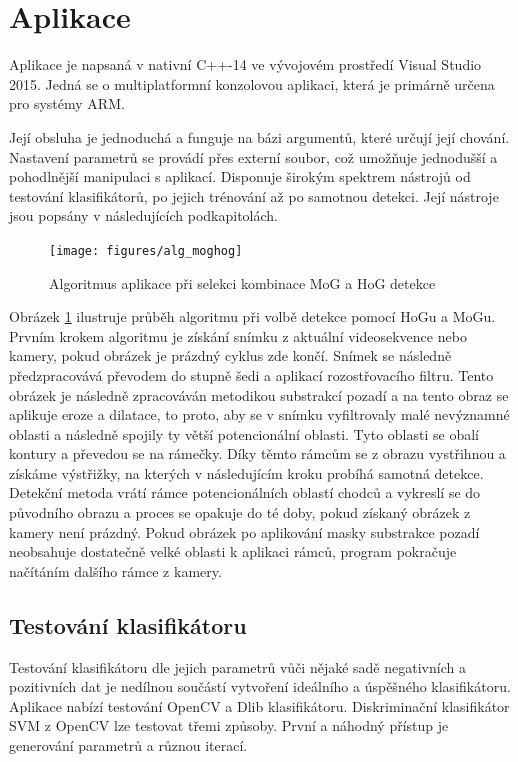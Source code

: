 \section{Aplikace}
Aplikace je napsaná v nativní C++-14 ve vývojovém prostředí Visual Studio 2015. Jedná se o multiplatformní konzolovou aplikaci, která je primárně určena pro systémy ARM. 

Její obsluha je jednoduchá a funguje na bázi argumentů, které určují její chování. Nastavení parametrů se provádí přes externí soubor, což umožňuje jednodušší a pohodlnější manipulaci s aplikací. Disponuje širokým spektrem nástrojů od testování klasifikátorů, po jejich trénování až po samotnou detekci. Její nástroje jsou popsány v následujících podkapitolách.


 \begin{figure}[H]
\centering
\texttt{[image: figures/alg\_moghog]}
\caption{Algoritmus aplikace při selekci kombinace MoG a HoG detekce}
\label{mog_algorithm}
\end{figure}

Obrázek \ref{mog_algorithm} ilustruje průběh algoritmu při volbě detekce pomocí HoGu a MoGu. Prvním krokem algoritmu je získání snímku z aktuální videosekvence nebo kamery, pokud obrázek je prázdný cyklus zde končí. Snímek se následně předzpracovává převodem do stupně šedi a aplikací rozostřovacího filtru. Tento obrázek je následně zpracováván metodikou substrakcí pozadí a na tento obraz se aplikuje eroze a dilatace, to proto, aby se v snímku vyfiltrovaly malé nevýznamné oblasti a následně spojily ty větší potencionální oblasti. Tyto oblasti se obalí kontury a převedou se na rámečky. Díky těmto rámcům se z obrazu vystřihnou a získáme výstřižky, na kterých v následujícím kroku probíhá samotná detekce. Detekční metoda vrátí rámce potencionálních oblastí chodců a vykreslí se do původního obrazu a proces se opakuje do té doby, pokud získaný obrázek z kamery není prázdný. Pokud obrázek po aplikování masky substrakce pozadí neobsahuje dostatečně velké oblasti k aplikaci rámců, program pokračuje načítáním dalšího rámce z kamery.  

\subsection{Testování klasifikátoru}
Testování klasifikátoru dle jejich parametrů vůči nějaké sadě negativních a pozitivních dat je nedílnou součástí vytvoření ideálního a úspěšného klasifikátoru.  Aplikace nabízí testování OpenCV a Dlib klasifikátoru. Diskriminační klasifikátor SVM z OpenCV lze testovat třemi způsoby. První a náhodný přístup je generování parametrů a různou iterací.

